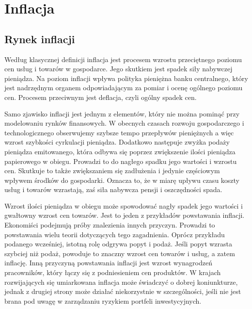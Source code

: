 \documentclass{mini}
\theoremstyle{mythstyle}
\begin{document}
%			
%		
%		
	
\chapter{Inflacja}
	
	\section{Rynek inflacji}
	
	Według klasycznej definicji inflacja jest procesem wzrostu przeciętnego poziomu cen usług i towarów w gospodarce. Jego skutkiem jest spadek siły nabywczej pieniądza. Na poziom inflacji wpływa polityka pieniężna banku centralnego, który jest nadrzędnym organem odpowiadającym za pomiar i ocenę ogólnego poziomu cen. Procesem przeciwnym jest deflacja, czyli ogólny spadek cen.
	
	Samo zjawisko inflacji jest jednym z elementów, który nie można pominąć przy modelowaniu rynków finansowych. W obecnych czasach rozwoju gospodarczego i technologicznego obserwujemy szybsze tempo przepływów pieniężnych a więc wzrost szybkości cyrkulacji pieniądza. Dodatkowo następuje zwyżka podaży pieniądza emitowanego, która odbywa się poprzez zwiększenie ilości pieniądza papierowego w obiegu. Prowadzi to do nagłego spadku jego wartości i wzrostu cen. Skutkuje to także zwiększaniem się zadłużenia i jedynie częściowym wpływem środków do gospodarki. Oznacza to, że w miarę upływu czasu koszty usług i towarów wzrastają, zaś siła nabywcza pensji i oszczędności spada.
	
	Wzrost ilości pieniądza w obiegu może spowodować nagły spadek jego wartości i gwałtowny wzrost cen towarów. Jest to jeden z przykładów powstawania inflacji. Ekonomiści podejmują próby znalezienia innych przyczyn. Prowadzi to powstawania wielu teorii dotyczących tego zagadnienia. Oprócz przykładu podanego wcześniej, istotną rolę odgrywa popyt i podaż. Jeśli popyt wzrasta szybciej niż podaż, powoduje to znaczny wzrost cen towarów i usług, a zatem inflację. Inną przyczyną powstawania inflacji jest wzrost wynagrodzeń pracowników, który łączy się z podniesieniem cen produktów. W krajach rozwijających się umiarkowana inflacja może świadczyć o dobrej koniunkturze, jednak z drugiej strony może działać niekorzystnie w szczególności, jeśli nie jest brana pod uwagę w zarządzaniu ryzykiem portfeli inwestycyjnych.
	
\end{document}
